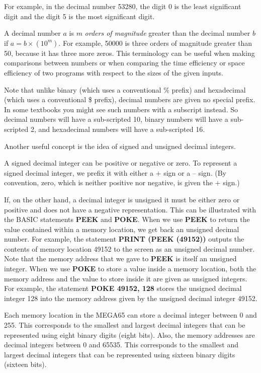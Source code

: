 For example, in the decimal number 53280, the digit 0 is the least significant digit and the digit 5 is the most significant digit.

A decimal number $a$ is $m$ {\it orders of magnitude} greater than the decimal number $b$ if $a = b \times (10^{m})$. For example, 50000 is three orders of magnitude greater than 50, because it has three more zeros. This terminology can be useful when making comparisons between numbers or when comparing the time efficiency or space efficiency of two programs with respect to the sizes of the given inputs.

Note that unlike binary (which uses a conventional \% prefix) and hexadecimal (which uses a conventional \$ prefix), decimal numbers are given no special prefix. In some textbooks you might see such numbers with a subscript instead. So decimal numbers will have a sub-scripted 10, binary numbers will have a sub-scripted 2, and hexadecimal numbers will have a sub-scripted 16.

Another useful concept is the idea of signed and unsigned decimal integers.

A signed decimal integer can be positive or negative or zero. To represent a signed decimal integer, we prefix it with either a $+$ sign or a $–$ sign. (By convention, zero, which is neither positive nor negative, is given the $+$ sign.)

If, on the other hand, a decimal integer is unsigned it must be either zero or positive and does not have a negative representation. This can be illustrated with the BASIC statements {\bf PEEK} and {\bf POKE}. When we use {\bf PEEK} to return the value contained within a memory location, we get back an unsigned decimal number. For example, the statement {\bf PRINT (PEEK (49152))} outputs the contents of memory location 49152 to the screen as an unsigned decimal number. Note that the memory address that we gave to {\bf PEEK} is itself an unsigned integer. When we use {\bf POKE} to store a value inside a memory location, both the memory address and the value to store inside it are given as unsigned integers. For example, the statement {\bf POKE 49152, 128} stores the unsigned decimal integer 128 into the memory address given by the unsigned decimal integer 49152.

Each memory location in the MEGA65 can store a decimal integer between 0 and 255. This corresponds to the smallest and largest decimal integers that can be represented using eight binary digits (eight bits). Also, the memory addresses are decimal integers between 0 and 65535. This corresponds to the smallest and largest decimal integers that can be represented using sixteen binary digits (sixteen bits).

